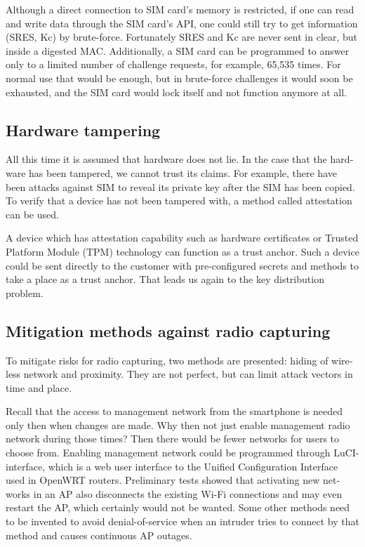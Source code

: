 \documentclass[12pt,a4paper,english]{tutthesis}
\begin{document}
\begin{otherlanguage}{english}
Although a direct connection to SIM card's memory is restricted,
if one can read and write data through the SIM card's API,
one could still try to get information (SRES, Kc) by brute-force. 
Fortunately SRES and Kc are never sent in clear, but inside
a digested MAC.
Additionally, a SIM card can be programmed to answer only to a
limited number of challenge requests, for example, 65,535 times.
For normal use that would be enough, but in brute-force challenges 
it would soon be exhausted, and the SIM card would lock itself and not
function anymore at all.


\subsection{Hardware tampering}
\label{sec-6-1-6}
All this time it is assumed that hardware does not lie. In the case
that the hardware has been tampered, we cannot trust its claims.
For example, there have been attacks against SIM to reveal its private
key after the SIM has been copied.  To verify that a device has not been
tampered with, a method called attestation can be used.

A device which has attestation capability such as 
hardware certificates or Trusted Platform Module (TPM) technology
can function as a trust anchor.
Such a device could be sent directly to the customer with pre-configured
secrets and methods to take a place as a trust anchor. 
That leads us again to the key distribution problem.


\subsection{Mitigation methods against radio capturing}
\label{sec-6-1-7}
To mitigate risks for radio capturing, two methods are presented: hiding of
wireless network and proximity. They are not perfect, but can
limit attack vectors in time and place.


Recall that the access to management network from the smartphone is
 needed only then when changes
are made. Why then not just enable management radio network
during those times? Then there would be fewer networks for users to choose from.
Enabling management network could be programmed through 
LuCI-interface, which is a web user interface to the Unified
 Configuration Interface used in OpenWRT routers.
Preliminary tests showed that activating new networks in an AP also 
disconnects the existing Wi-Fi connections and may even restart the AP,
which certainly would not be wanted. Some other methods need to
be invented to avoid denial-of-service when an intruder tries to 
connect by that method and causes continuous AP outages.


\end{otherlanguage}
\end{document}
